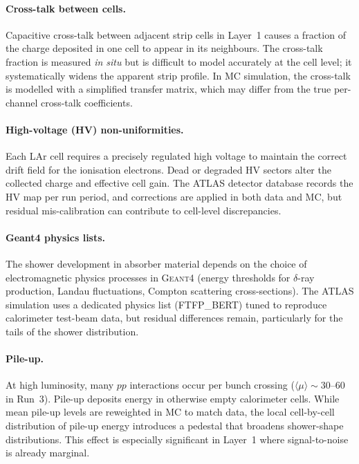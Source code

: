 \documentclass[11pt,a4paper]{article}
\newcommand{\avgmu}{\langle\mu\rangle}
\begin{document}
\paragraph{Cross-talk between cells.}
Capacitive cross-talk between adjacent strip cells in Layer~1 causes
a fraction of the charge deposited in one cell to appear in its
neighbours.  The cross-talk fraction is measured \emph{in situ} but
is difficult to model accurately at the cell level; it systematically
widens the apparent strip profile.  In MC simulation, the cross-talk
is modelled with a simplified transfer matrix, which may differ from
the true per-channel cross-talk coefficients.

\paragraph{High-voltage (HV) non-uniformities.}
Each LAr cell requires a precisely regulated high voltage to maintain
the correct drift field for the ionisation electrons.  Dead or
degraded HV sectors alter the collected charge and effective cell
gain.  The ATLAS detector database records the HV map per run period,
and corrections are applied in both data and MC, but residual
mis-calibration can contribute to cell-level discrepancies.

\paragraph{Geant4 physics lists.}
The shower development in absorber material depends on the choice
of electromagnetic physics processes in \textsc{Geant4} (energy
thresholds for $\delta$-ray production, Landau fluctuations, Compton
scattering cross-sections).  The ATLAS simulation uses a dedicated
physics list (FTFP\_BERT) tuned to reproduce calorimeter
test-beam data, but residual differences remain, particularly for
the tails of the shower distribution.

\paragraph{Pile-up.}
At high luminosity, many $pp$ interactions occur per bunch crossing
($\avgmu \sim 30$--$60$ in Run~3).  Pile-up deposits energy in
otherwise empty calorimeter cells.  While mean pile-up levels are
reweighted in MC to match data, the local cell-by-cell distribution
of pile-up energy introduces a pedestal that broadens shower-shape
distributions.  This effect is especially significant in
Layer~1 where signal-to-noise is already marginal.
\end{document}
